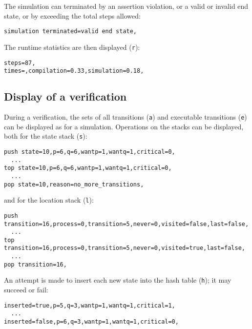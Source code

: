 \documentclass[11pt]{article}
\newcommand*{\p}[1]{\texttt{#1}}
\begin{document}
The simulation can terminated by an assertion violation, or a valid or
invalid end state, or by exceeding the total steps allowed:

\begin{footnotesize}
\begin{verbatim}
simulation terminated=valid end state,
\end{verbatim}
\end{footnotesize}

The runtime statistics are then displayed (\p{r}):

\begin{footnotesize}
\begin{verbatim}
steps=87,
times=,compilation=0.33,simulation=0.18,
\end{verbatim}
\end{footnotesize}

\subsection{Display of a verification}

During a verification, the sets of all transitions (\p{a}) and
executable transitions (\p{e}) can be displayed as for a simulation.
Operations on the stacks can be displayed, both for the state stack
(\p{s}):

\begin{footnotesize}
\begin{verbatim}
push state=10,p=6,q=6,wantp=1,wantq=1,critical=0,
  ...
top state=10,p=6,q=6,wantp=1,wantq=1,critical=0,
  ...
pop state=10,reason=no_more_transitions,
\end{verbatim}
\end{footnotesize}

and for the location stack (\p{l}):

\begin{footnotesize}
\begin{verbatim}
push transition=16,process=0,transition=5,never=0,visited=false,last=false,
  ...
top transition=16,process=0,transition=5,never=0,visited=true,last=false,
  ...
pop transition=16,
\end{verbatim}
\end{footnotesize}

An attempt is made to insert each new state into the hash table (\p{h});
it may succeed or fail:

\begin{footnotesize}
\begin{verbatim}
inserted=true,p=5,q=3,wantp=1,wantq=1,critical=1,
  ...
inserted=false,p=6,q=3,wantp=1,wantq=1,critical=0,
\end{verbatim}
\end{footnotesize}
\end{document}

